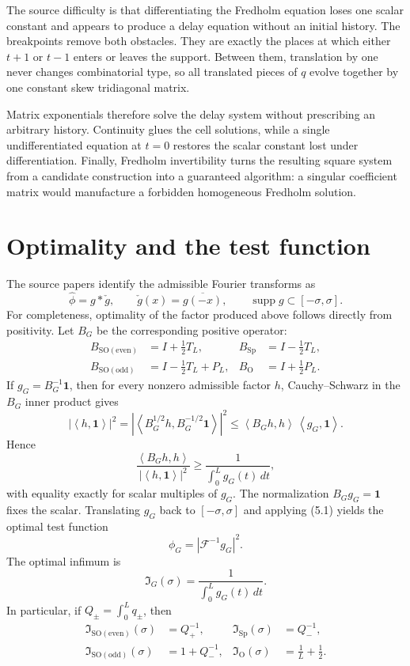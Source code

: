 \documentclass[11pt]{article}
\theoremstyle{definition}
\theoremstyle{remark}
\newcommand{\1}{\mathbf 1}
\newcommand{\Sp}{\mathrm{Sp}}
\newcommand{\SOe}{\mathrm{SO(even)}}
\newcommand{\SOo}{\mathrm{SO(odd)}}
\newcommand{\OO}{\mathrm O}
\newcommand{\ip}[2]{\left\langle #1,#2\right\rangle}
\begin{document}
The source difficulty is that differentiating the Fredholm equation loses
one scalar constant and appears to produce a delay equation without an
initial history. The breakpoints remove both obstacles. They are exactly the
places at which either $t+1$ or $t-1$ enters or leaves the support. Between
them, translation by one never changes combinatorial type, so all translated
pieces of $q$ evolve together by one constant skew tridiagonal matrix.

Matrix exponentials therefore solve the delay system without prescribing an
arbitrary history. Continuity glues the cell solutions, while a single
undifferentiated equation at $t=0$ restores the scalar constant lost under
differentiation. Finally, Fredholm invertibility turns the resulting square
system from a candidate construction into a guaranteed algorithm: a
singular coefficient matrix would manufacture a forbidden homogeneous
Fredholm solution.

\section{Optimality and the test function}

The source papers identify the admissible Fourier transforms as
\[
 \widehat\phi=g*\check g,\qquad
 \check g(x)=\overline{g(-x)},\qquad
 \operatorname{supp}g\subset[-\sigma,\sigma].
                                                               \tag{5.1}
\]
For completeness, optimality of the factor produced above follows directly
from positivity. Let $B_G$ be the corresponding positive operator:
\[
\begin{aligned}
B_{\SOe}&=I+\tfrac12T_L,&
B_{\Sp}&=I-\tfrac12T_L,\\
B_{\SOo}&=I-\tfrac12T_L+P_L,&
B_{\OO}&=I+\tfrac12P_L.
\end{aligned}
\]
If $g_G=B_G^{-1}\1$, then for every nonzero admissible factor $h$,
Cauchy--Schwarz in the $B_G$ inner product gives
\[
 |\ip{h}{\1}|^2
 =|\ip{B_G^{1/2}h}{B_G^{-1/2}\1}|^2
 \leq \ip{B_Gh}{h}\,\ip{g_G}{\1}.                        \tag{5.2}
\]
Hence
\[
 \frac{\ip{B_Gh}{h}}{|\ip{h}{\1}|^2}
 \geq\frac{1}{\int_0^L g_G(t)\,dt},                      \tag{5.3}
\]
with equality exactly for scalar multiples of $g_G$. The normalization
$B_Gg_G=\1$ fixes the scalar. Translating $g_G$ back to
$[-\sigma,\sigma]$ and applying (5.1) yields the optimal test function
\[
 \phi_G=\left|\mathcal F^{-1}g_G\right|^2.                \tag{5.4}
\]
The optimal infimum is
\[
 \mathfrak I_G(\sigma)
 =\frac{1}{\int_0^L g_G(t)\,dt}.                         \tag{5.5}
\]
In particular, if $Q_\pm=\int_0^Lq_\pm$, then
\[
\begin{aligned}
\mathfrak I_{\SOe}(\sigma)&=Q_+^{-1},&
\mathfrak I_{\Sp}(\sigma)&=Q_-^{-1},\\
\mathfrak I_{\SOo}(\sigma)&=1+Q_-^{-1},&
\mathfrak I_{\OO}(\sigma)&=\frac1L+\frac12.
\end{aligned}                                             \tag{5.6}
\]
\end{document}

